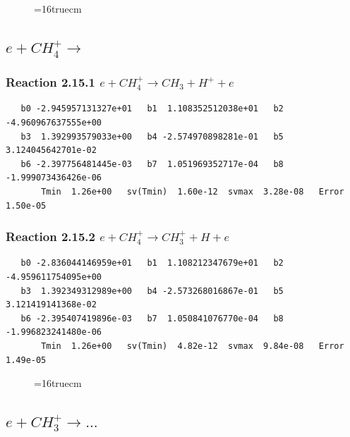 \documentclass[12pt,dvipdfmx]{article}
\begin{document}
\begin{figure} \label{met.2_2.13}
\epsfxsize=16truecm
\end{figure}
\newpage

\subsection{
$e + CH_4^+ \rightarrow $
}

\subsubsection{
Reaction 2.15.1    $e + CH_4^+ \rightarrow CH_3 + H^+ + e $
}

\begin{small}\begin{verbatim}
   b0 -2.945957131327e+01   b1  1.108352512038e+01   b2 -4.960967637555e+00
   b3  1.392993579033e+00   b4 -2.574970898281e-01   b5  3.124045642701e-02
   b6 -2.397756481445e-03   b7  1.051969352717e-04   b8 -1.999073436426e-06
       Tmin  1.26e+00   sv(Tmin)  1.60e-12  svmax  3.28e-08   Error  1.50e-05
\end{verbatim}\end{small}

\subsubsection{
Reaction 2.15.2    $e + CH_4^+ \rightarrow CH_3^+ + H + e $
}

\begin{small}\begin{verbatim}
   b0 -2.836044146959e+01   b1  1.108212347679e+01   b2 -4.959611754095e+00
   b3  1.392349312989e+00   b4 -2.573268016867e-01   b5  3.121419141368e-02
   b6 -2.395407419896e-03   b7  1.050841076770e-04   b8 -1.996823241480e-06
       Tmin  1.26e+00   sv(Tmin)  4.82e-12  svmax  9.84e-08   Error  1.49e-05
\end{verbatim}\end{small}

\begin{figure} \label{met.2_2.15}
\epsfxsize=16truecm
\end{figure}
\newpage

\subsection{
$e + CH_3^+ \rightarrow ... $
}
\end{document}
